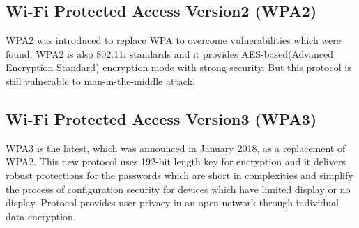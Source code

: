 \subsection{Wi-Fi Protected Access Version2 (WPA2)}
WPA2\cite{wpa_def_2} was introduced to replace WPA to overcome vulnerabilities which were found. WPA2 is also 802.11i standards and it provides AES-based(Advanced Encryption Standard) encryption mode with strong security. But this protocol is still vulnerable to man-in-the-middle attack.

\subsection{Wi-Fi Protected Access Version3 (WPA3)}
WPA3\cite{wpa_def_2} is the latest, which was announced in January 2018, as a replacement of WPA2. This new protocol uses 192-bit length key for encryption and it delivers robust protections for the passwords which are short in complexities and simplify the process of configuration security for devices which have limited display or no display. Protocol provides user privacy in an open network through individual data encryption.\cite{wpa_v3}

